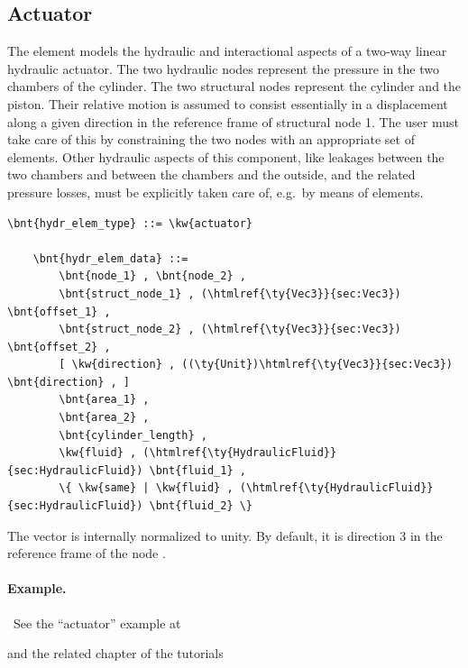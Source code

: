 \subsection{Actuator}
The  element models the hydraulic and interactional aspects
of a two-way linear hydraulic actuator.
The two hydraulic nodes represent the pressure in the two chambers
of the cylinder.
The two structural nodes represent the cylinder and the piston.
Their relative motion is assumed to consist essentially
in a displacement along a given direction in the reference frame
of structural node 1.
The user must take care of this by constraining the two nodes
with an appropriate set of  elements.
Other hydraulic aspects of this component, like leakages between
the two chambers and between the chambers and the outside,
and the related pressure losses, must be explicitly taken care of,
e.g.\ by means of  elements.
\label{sec:EL:HYDR:ACTUATOR}
\begin{Verbatim}[commandchars=\\\{\}]
    \bnt{hydr_elem_type} ::= \kw{actuator}

    \bnt{hydr_elem_data} ::=
        \bnt{node_1} , \bnt{node_2} , 
        \bnt{struct_node_1} , (\htmlref{\ty{Vec3}}{sec:Vec3}) \bnt{offset_1} ,
        \bnt{struct_node_2} , (\htmlref{\ty{Vec3}}{sec:Vec3}) \bnt{offset_2} ,
        [ \kw{direction} , ((\ty{Unit})\htmlref{\ty{Vec3}}{sec:Vec3}) \bnt{direction} , ]
        \bnt{area_1} ,
        \bnt{area_2} ,
        \bnt{cylinder_length} ,
        \kw{fluid} , (\htmlref{\ty{HydraulicFluid}}{sec:HydraulicFluid}) \bnt{fluid_1} ,
        \{ \kw{same} | \kw{fluid} , (\htmlref{\ty{HydraulicFluid}}{sec:HydraulicFluid}) \bnt{fluid_2} \}
\end{Verbatim}
The vector  is internally normalized to unity.
By default, it is direction 3 in the reference frame of the 
node .

\paragraph{Example.} \
See the ``actuator'' example at
\begin{quote}
\end{quote}
and the related chapter of the tutorials
\begin{quote}
\end{quote}



